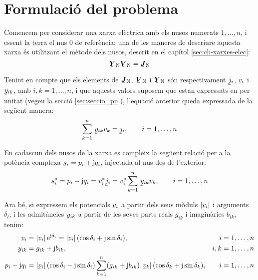 \section{Formulació del problema}\label{sec:formul_prob} 

Comencem per considerar una xarxa elèctrica amb els nusos numerats
$1,\ldots,n$, i essent la terra el nus 0 de referència; una de les
maneres de descriure aquesta xarxa és utilitzant el mètode dels
nusos, descrit en el capítol \ref{sec:ch-xarxes-elec}:
\begin{equation}
    \mcmplx{Y}\ped{N} \mcmplx{V}\ped{N} = \mcmplx{J}\ped{N}
\end{equation}

Tenint en compte que els elements de $\mcmplx{J}\ped{N}$,
$\mcmplx{V}\ped{N}$ i $\mcmplx{Y}\ped{N}$ són respectivament $\cmplx{j}_i$,
$\cmplx{v}_i$ i  $\cmplx{y}_{ik}$, amb $i,k=1,\ldots,n$, 
i que aquests valors suposem que estan expressats en per unitat (vegeu la
secció \ref{sec:seccio_pu}), l'equació anterior queda expressada de
la següent manera:
\begin{equation}
    \sum^n_{k=1}\, \cmplx{y}_{ik} \cmplx{v}_k = \cmplx{j}_i, \qquad i=1,\ldots,n
\end{equation}

En cadascun dels nusos de la xarxa es compleix la següent relació
per a la potència complexa $\cmplx{s}_i = p_i + \ju q_i$, injectada
al nus des de l'exterior:
\begin{equation}
    \cmplx{s}_i^* = p_i - \ju q_i = \cmplx{v}_i^* \cmplx{j}_i = \cmplx{v}_i^*
    \sum^n_{k=1}\, \cmplx{y}_{ik} \cmplx{v}_k, \qquad i=1,\ldots,n \label{eq:sconj}
\end{equation}

Ara bé, si expressem els potencials $\cmplx{v}_i$ a partir dels seus mòduls $|\cmplx{v}_i|$
i arguments $\delta_i$, i les admitàncies $\cmplx{y}_{ik}$ a partir de les seves parts
reals $g_{ik}$ i imaginàries $b_{ik}$, tenim:
\begin{align}
    \cmplx{v}_i &=|\cmplx{v}_i|\, \eu^{\ju\delta_i} = |\cmplx{v}_i|\,
    (\cos\delta_i+\ju\sin\delta_i), & i & =1,\ldots,n\\
    \cmplx{y}_{ik} &= g_{ik} + \ju b_{ik}, & i,k & =1,\ldots,n \\
    p_i - \ju q_i &= |\cmplx{v}_i|\, (\cos\delta_i - \ju\sin\delta_i) \sum^n_{k=1} (g_{ik} + \ju
    b_{ik}) \,|\cmplx{v}_k| \,(\cos\delta_k + \ju\sin\delta_k), & i & =1,\ldots,n
\end{align}

